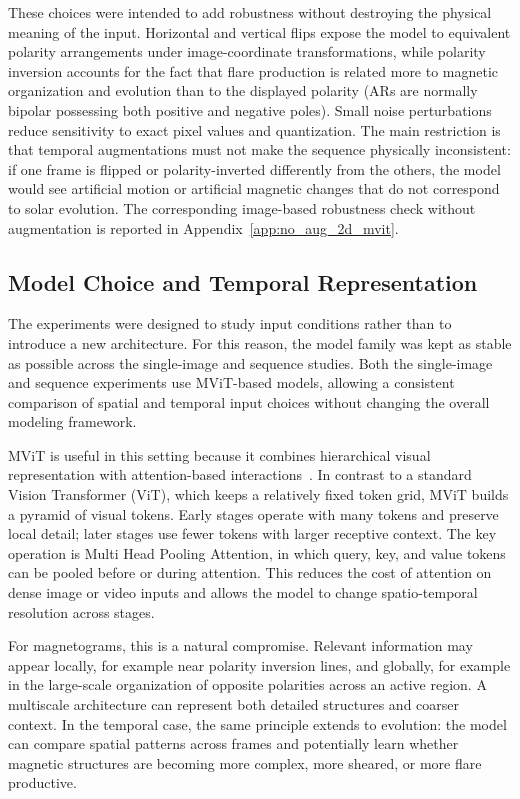 These choices were intended to add robustness without destroying the physical meaning of the input. Horizontal and vertical flips expose the model to equivalent polarity arrangements under image-coordinate transformations, while polarity inversion accounts for the fact that flare production is related more to magnetic organization and evolution than to the displayed polarity (ARs are normally bipolar possessing both positive and negative poles). Small noise perturbations reduce sensitivity to exact pixel values and quantization. The main restriction is that temporal augmentations must not make the sequence physically inconsistent: if one frame is flipped or polarity-inverted differently from the others, the model would see artificial motion or artificial magnetic changes that do not correspond to solar evolution. The corresponding image-based robustness check without augmentation is reported in Appendix~\ref{app:no_aug_2d_mvit}.

\subsection{Model Choice and Temporal Representation}

The experiments were designed to study input conditions rather than to introduce a new architecture. For this reason, the model family was kept as stable as possible across the single-image and sequence studies. Both the single-image and sequence experiments use MViT-based models, allowing a consistent comparison of spatial and temporal input choices without changing the overall modeling framework.

MViT is useful in this setting because it combines hierarchical visual representation with attention-based interactions~\cite{ref_mvit}. In contrast to a standard Vision Transformer (ViT), which keeps a relatively fixed token grid, MViT builds a pyramid of visual tokens. Early stages operate with many tokens and preserve local detail; later stages use fewer tokens with larger receptive context. The key operation is Multi Head Pooling Attention, in which query, key, and value tokens can be pooled before or during attention. This reduces the cost of attention on dense image or video inputs and allows the model to change spatio-temporal resolution across stages.

For magnetograms, this is a natural compromise. Relevant information may appear locally, for example near polarity inversion lines, and globally, for example in the large-scale organization of opposite polarities across an active region. A multiscale architecture can represent both detailed structures and coarser context. In the temporal case, the same principle extends to evolution: the model can compare spatial patterns across frames and potentially learn whether magnetic structures are becoming more complex, more sheared, or more flare productive.

